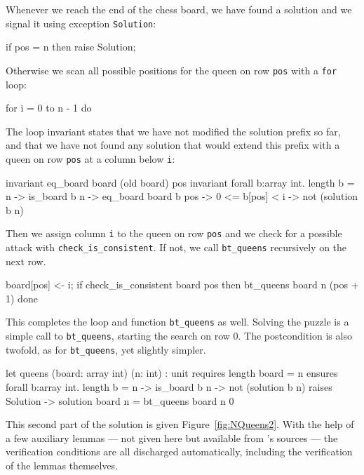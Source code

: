 Whenever we reach the end of the chess board, we have found a solution
and we signal it using exception \texttt{Solution}:
\begin{whycode}
    if pos = n then raise Solution;
\end{whycode}
Otherwise we scan all possible positions for the queen on row
\texttt{pos} with a \texttt{for} loop:
\begin{whycode}
    for i = 0 to n - 1 do
\end{whycode}
The loop invariant states that we have not modified the solution
prefix so far, and that we have not found any solution that would
extend this prefix with a queen on row \texttt{pos} at a column below
\texttt{i}:
\begin{whycode}
      invariant { eq_board board (old board) pos }
      invariant { forall b:array int.  length b = n -> is_board b n ->
        eq_board board b pos -> 0 <= b[pos] < i -> not (solution b n) }
\end{whycode}
Then we assign column \texttt{i} to the queen on row \texttt{pos} and
we check for a possible attack with \verb|check_is_consistent|. If
not, we call \verb|bt_queens| recursively on the next row.
\begin{whycode}
      board[pos] <- i;
      if check_is_consistent board pos then bt_queens board n (pos + 1)
    done
\end{whycode}
This completes the loop and function \verb|bt_queens| as well.
Solving the puzzle is a simple call to \verb|bt_queens|, starting the
search on row 0. The postcondition is also twofold, as for
\verb|bt_queens|, yet slightly simpler.
\begin{whycode}
  let queens (board: array int) (n: int) : unit
    requires { length board = n }
    ensures  { forall b:array int.
                 length b = n -> is_board b n -> not (solution b n) }
    raises   { Solution -> solution board n }
  = bt_queens board n 0
\end{whycode}
This second part of the solution is given Figure~\ref{fig:NQueens2}.
With the help of a few auxiliary lemmas --- not given here but available
from \why's sources --- the verification conditions are all discharged
automatically, including the verification of the lemmas themselves.

